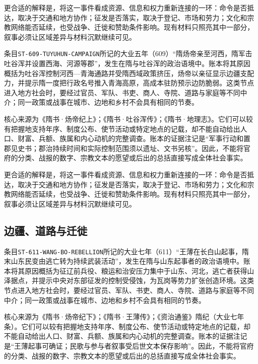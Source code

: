 更合适的解释是，将这一事件看成资源、信息和权力重新连接的一环：命令是否抵达，取决于交通和地方协作；征发是否落实，取决于登记、市场和劳力；文化和宗教网络能否延续，也受战争、迁徙和赞助条件影响。现有材料只照亮其中一部分，叙事必须让区域差异与材料沉默继续可见。


条目\texttt{ST-609-TUYUHUN-CAMPAIGN}所记的大业五年（609）“隋炀帝亲至河西，隋军击吐谷浑并设置西海、河源等郡”，发生在隋与吐谷浑的政治语境中。账本将其原因概括为吐谷浑控制河西—青海通路并受隋西域政策挤压，炀帝以亲征显示边疆支配力，并提示隋一度把行政名号推入青海高原，高成本驻防预示边防脆弱。这类节点进入地方社会时，要经过官员、军队、书吏、商人、寺院、道路与家庭等不同中介；同一政策或战事在城市、边地和乡村不会具有相同的节奏。

核心来源为《隋书·炀帝纪上》；《隋书·吐谷浑传》；《隋书·地理志》。它们可以较有把握地支持年序、制度公布、使节活动或特定地点的记载，却不能自动给出人口、财富、兵额、族属和内心动机的完整调查。账本的证据注记是“军事行动和置郡见史书；郡治持续时间和实际控制范围须以遗址、文书另核”。因此，不能将官府的分类、战报的数字、宗教文本的愿望或后出的总括直接写成全体社会事实。

更合适的解释是，将这一事件看成资源、信息和权力重新连接的一环：命令是否抵达，取决于交通和地方协作；征发是否落实，取决于登记、市场和劳力；文化和宗教网络能否延续，也受战争、迁徙和赞助条件影响。现有材料只照亮其中一部分，叙事必须让区域差异与材料沉默继续可见。

\subsection{边疆、道路与迁徙}


条目\texttt{ST-611-WANG-BO-REBELLION}所记的大业七年（611）“王薄在长白山起事，隋末山东民变由逃亡转为持续武装活动”，发生在隋与山东起事者的政治语境中。账本将其原因概括为征辽前兵役、粮运和治安压力集中于山东、河北，逃亡者获得山泽据点，并提示中央对东部征发的控制受侵蚀，为瓦岗等势力扩张创造环境。这类节点进入地方社会时，要经过官员、军队、书吏、商人、寺院、道路与家庭等不同中介；同一政策或战事在城市、边地和乡村不会具有相同的节奏。

核心来源为《隋书·炀帝纪下》；《隋书·王薄传》；《资治通鉴》隋纪（大业七年条）。它们可以较有把握地支持年序、制度公布、使节活动或特定地点的记载，却不能自动给出人口、财富、兵额、族属和内心动机的完整调查。账本的证据注记是“王薄起事可确证；民歌与参与者叙事受后世文本保存影响”。因此，不能将官府的分类、战报的数字、宗教文本的愿望或后出的总括直接写成全体社会事实。


